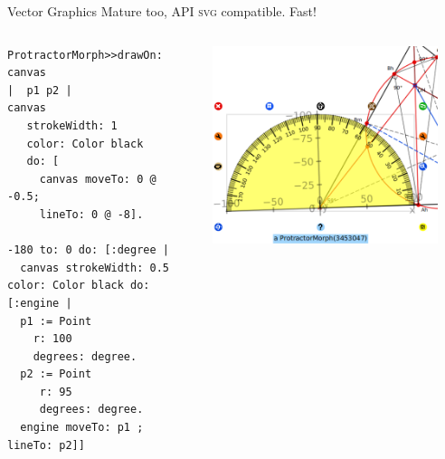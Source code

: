 \documentclass{beamer}
\begin{document}
%
\begin{frame}[fragile]{Vector Graphics}
 Mature too, API \textsc{svg} compatible. Fast!
  \vspace{0.5cm}
  \begin{columns}[c]
  \begin{column}{0.5\textwidth}
\fontsize{8pt}{0pt}\selectfont
\begin{lstlisting}[language=Smalltalk]
ProtractorMorph>>drawOn: canvas
|  p1 p2 |
canvas
   strokeWidth: 1
   color: Color black
   do: [
     canvas moveTo: 0 @ -0.5;
     lineTo: 0 @ -8].
     
-180 to: 0 do: [:degree |
  canvas strokeWidth: 0.5 color: Color black do: [:engine |
  p1 := Point
    r: 100
    degrees: degree.
  p2 := Point
     r: 95
     degrees: degree.
  engine moveTo: p1 ; lineTo: p2]]
\end{lstlisting}
\end{column} 
  \begin{column}{0.5\textwidth}
    \includegraphics[width=0.9\textwidth]{VectorGraphics.png}
  \end{column}  
\end{columns}
\end{frame}
%
\end{document}
